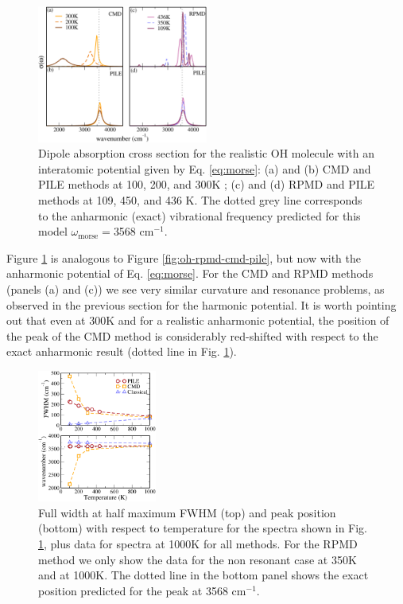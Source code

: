 \documentclass[aps,prb,superscriptaddress,amsmath,amssymb,showpacs,twocolumn]{revtex4}
\begin{document}
\begin{figure}[htbp]
\centering
\includegraphics[width=0.5\textwidth]{figures/comparison_ohanharm_factors.pdf}
\caption{Dipole absorption cross section for the realistic OH molecule with an interatomic 
potential given by Eq. \ref{eq:morse}: (a) and (b) CMD and PILE methods at 100, 200, 
and 300K ; (c)  and (d) RPMD and PILE methods at 109, 450, and 436 K. The dotted grey line corresponds to the 
anharmonic (exact) vibrational frequency predicted for this model $\omega_\text{morse}=$3568 cm$^{-1}$.}
\label{fig:ohreal-rpmd-cmd-pile}
\end{figure}

Figure \ref{fig:ohreal-rpmd-cmd-pile} is analogous to Figure \ref{fig:oh-rpmd-cmd-pile}, 
but now with the anharmonic potential of Eq. \ref{eq:morse}. 
For the CMD and RPMD methods (panels (a) and (c)) we
see very similar curvature and resonance problems, as observed in the 
previous section for the harmonic potential. 
It is worth pointing out that even at 300K and for a realistic anharmonic potential, 
the position of the peak of the CMD method is considerably red-shifted with respect 
to the exact anharmonic result (dotted line in Fig. \ref{fig:ohreal-rpmd-cmd-pile}). 

\begin{figure}[htbp]
\centering
\includegraphics[width=0.35\textwidth]{figures/ohreal_positionbroad.pdf}
\caption{Full width at half maximum FWHM (top) and peak position (bottom) with respect 
to temperature for the spectra shown in Fig. \ref{fig:ohreal-rpmd-cmd-pile}, 
plus data for spectra at 1000K for all methods. For the RPMD method we only 
show the data for the non resonant case at 350K and at 1000K. The dotted line 
in the bottom panel shows the exact position predicted for the peak at 3568 cm$^{-1}$.}
\label{fig:ohreal-position-broad}
\end{figure}
\end{document}
